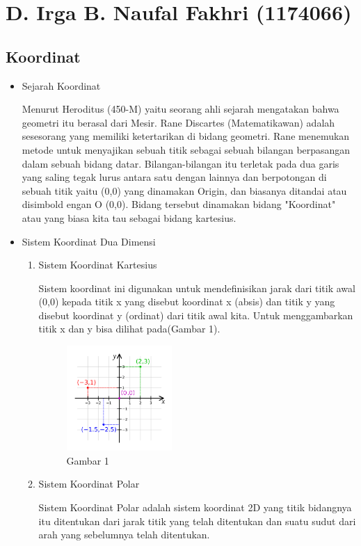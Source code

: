 \section{D. Irga B. Naufal Fakhri (1174066)}
\subsection{Koordinat}
\begin{itemize}
	\item Sejarah Koordinat
	
Menurut Heroditus (450-M) yaitu seorang ahli sejarah mengatakan bahwa geometri itu berasal dari Mesir. Rane Discartes (Matematikawan) adalah sesesorang yang memiliki ketertarikan di bidang geometri. Rane menemukan metode untuk menyajikan sebuah titik sebagai sebuah bilangan berpasangan dalam sebuah bidang datar. Bilangan-bilangan itu terletak pada dua garis yang saling tegak lurus antara satu dengan lainnya dan berpotongan di sebuah titik yaitu (0,0) yang dinamakan Origin, dan biasanya ditandai atau disimbold engan O (0,0). Bidang tersebut dinamakan bidang "Koordinat" atau yang biasa kita tau sebagai bidang kartesius.
	\item Sistem Koordinat Dua Dimensi
	\begin{enumerate}
	\item Sistem Koordinat Kartesius
	
Sistem koordinat ini digunakan untuk mendefinisikan jarak dari titik awal (0,0) kepada titik x yang disebut koordinat x (absis) dan titik y yang disebut koordinat y (ordinat) dari titik awal kita.
Untuk menggambarkan titik x dan y bisa dilihat pada(Gambar 1).
	\begin{figure}[H]
	\includegraphics[width=4cm]{figures/Tugas1/1174066/kartesius.png}
	\centering
	\caption{Gambar 1}
\end{figure}
	
	\item Sistem Koordinat Polar

Sistem Koordinat Polar adalah sistem koordinat 2D yang titik bidangnya itu ditentukan dari jarak titik yang telah ditentukan dan suatu sudut dari arah yang sebelumnya telah ditentukan.


\end{enumerate}
\end{itemize}
